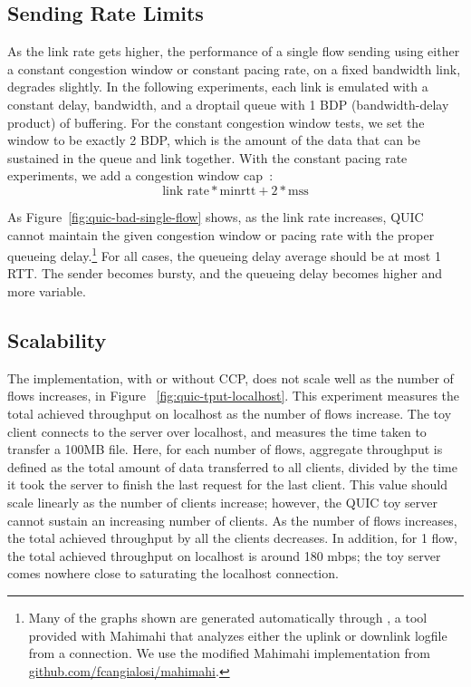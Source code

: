 \subsection{Sending Rate Limits}
As the link rate gets higher, the performance of a single flow sending using either a constant congestion window or constant pacing rate, on a fixed bandwidth link, degrades slightly.
In the following experiments, each link is emulated with a constant delay, bandwidth, and a droptail queue with 1 BDP (bandwidth-delay product) of buffering.
For the constant congestion window tests, we set the window to be exactly 2 BDP, which is the amount of the data that can be sustained in the queue and link together.
With the constant pacing rate experiments, we add a congestion window cap~\cite{bbrcode}:
$$\textrm{link rate} * \textrm{minrtt} + 2*\textrm{mss}$$

As Figure~\ref{fig:quic-bad-single-flow} shows, as the link rate increases, QUIC cannot maintain the given congestion window or pacing rate with the proper queueing delay.\footnote{Many of the graphs shown are generated automatically through , a tool provided with Mahimahi that analyzes either the uplink or downlink logfile from a connection. We use the modified Mahimahi  implementation from \url{github.com/fcangialosi/mahimahi}.}
For all cases, the queueing delay average should be at most 1 RTT.
The sender becomes bursty, and the queueing delay becomes higher and more variable.

\subsection{Scalability}

The implementation, with or without CCP, does not scale well as the number of flows increases, in Figure ~\ref{fig:quic-tput-localhost}.
This experiment measures the total achieved throughput on localhost as the number of flows increase.
The toy client connects to the server over localhost, and measures the time taken to transfer a 100MB file.
Here, for each number of flows, aggregate throughput is defined as the total amount of data transferred to all clients, divided by the time it took the server to finish the last request for the last client.
This value should scale linearly as the number of clients increase; however, the QUIC toy server cannot sustain an increasing number of clients.
As the number of flows increases, the total achieved throughput by all the clients decreases.
In addition, for 1 flow, the total achieved throughput on localhost is around 180 mbps; the toy server comes nowhere close to saturating the localhost connection.

